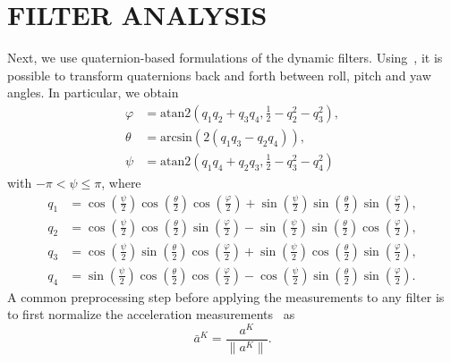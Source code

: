 \section{FILTER ANALYSIS} \label{sec:Analysis}
Next, we use quaternion-based formulations of the dynamic filters. 
Using~\cite{Berner2007}, it is possible to transform quaternions back and forth between roll, pitch and yaw angles. In particular, we obtain
\begin{subequations}
	\begin{align}
		\varphi &= \mathrm{atan2}\left(q_1 q_2 + q_3 q_4,\tfrac{1}{2}-q_2 ^2 - q_3 ^2\right), \label{eq:analysis:phi}\\
		\theta &= \mathrm{arcsin}\left(2(q_1 q_3 - q_2 q_4)\right), \\
		\psi &= \mathrm{atan2}\left(q_1 q_4 + q_2 q_3 ,\tfrac{1}{2}-q_3 ^2 - q_4 ^2\right)
	\end{align}	
\end{subequations}
with $-\pi<\psi\leq\pi$, where 
\begin{subequations}
	\begin{align}
		q_1 &= \cos(\tfrac{\psi}{2})\cos(\tfrac{\theta}{2})\cos(\tfrac{\varphi}{2})+\sin(\tfrac{\psi}{2})\sin(\tfrac{\theta}{2})\sin(\tfrac{\varphi}{2}), \\
		q_2 &= \cos(\tfrac{\psi}{2})\cos(\tfrac{\theta}{2})\sin(\tfrac{\varphi}{2})-\sin(\tfrac{\psi}{2})\sin(\tfrac{\theta}{2})\cos(\tfrac{\varphi}{2}), \\
		q_3 &= \cos(\tfrac{\psi}{2})\sin(\tfrac{\theta}{2})\cos(\tfrac{\varphi}{2})+\sin(\tfrac{\psi}{2})\cos(\tfrac{\theta}{2})\sin(\tfrac{\varphi}{2}), \\
		q_4 &= \sin(\tfrac{\psi}{2})\cos(\tfrac{\theta}{2})\cos(\tfrac{\varphi}{2})-\cos(\tfrac{\psi}{2})\sin(\tfrac{\theta}{2})\sin(\tfrac{\varphi}{2}).
	\end{align}
\end{subequations}
A common preprocessing step before applying the measurements to any filter is to first normalize the acceleration measurements~\cite{Mahony2008,Madgwick2011,Euston2008} as
\begin{equation}
	\bar{a}^K = \frac{a^K}{\|a^K \|}.
\end{equation}

